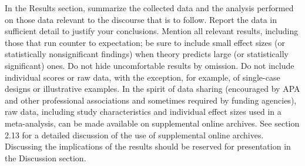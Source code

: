 In the Results section, summarize the collected data and the analysis performed on those data relevant to the discourse that is to follow. Report the data in sufficient detail to justify your conclusions. Mention all relevant results, including those that run counter to expectation; be sure to include small effect sizes (or statistically nonsignificant findings) when theory predicts large (or statistically significant) ones. Do not hide uncomfortable results by omission. Do not include individual scores or raw data, with the exception, for example, of single-case designs or illustrative examples. In the spirit of data sharing (encouraged by APA and other professional associations and sometimes required by funding agencies), raw data, including study characteristics and individual effect sizes used in a meta-analysis, can be made available on supplemental online archives. See section 2.13 for a detailed discussion of the use of supplemental online archives. Discussing the implications of the results should be reserved for presentation in the Discussion section.
